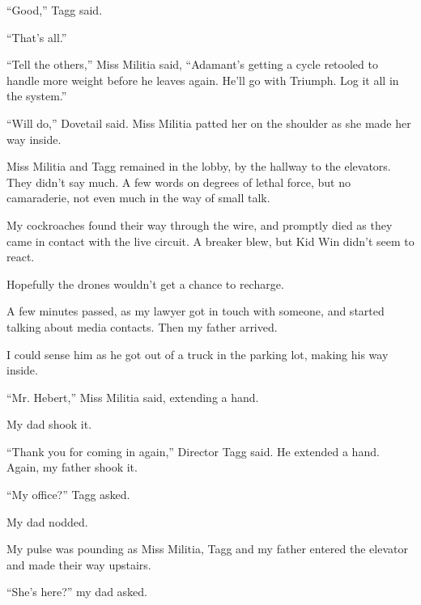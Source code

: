 ``Good,'' Tagg said.



``That's all.''



``Tell the others,'' Miss Militia said, ``Adamant's getting a cycle retooled to handle more weight before he leaves again.  He'll go with Triumph.  Log it all in the system.''



``Will do,'' Dovetail said.  Miss Militia patted her on the shoulder as she made her way inside.



Miss Militia and Tagg remained in the lobby, by the hallway to the elevators.  They didn't say much.  A few words on degrees of lethal force, but no camaraderie, not even much in the way of small talk.



My cockroaches found their way through the wire, and promptly died as they came in contact with the live circuit.  A breaker blew, but Kid Win didn't seem to react.



Hopefully the drones wouldn't get a chance to recharge.



A few minutes passed, as my lawyer got in touch with someone, and started talking about media contacts.  Then my father arrived.



I could sense him as he got out of a truck in the parking lot, making his way inside.



``Mr. Hebert,'' Miss Militia said, extending a hand.



My dad shook it.



``Thank you for coming in again,'' Director Tagg said.  He extended a hand.  Again, my father shook it.



``My office?'' Tagg asked.



My dad nodded.



My pulse was pounding as Miss Militia, Tagg and my father entered the elevator and made their way upstairs.



``She's here?'' my dad asked.



